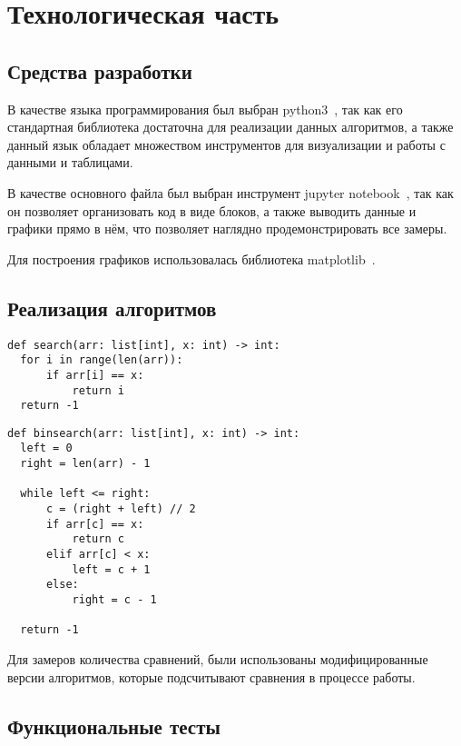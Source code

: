 \chapter{Технологическая часть}
\section{Средства разработки}

В качестве языка программирования был выбран python3~\cite{python3}, так как его стандартная библиотека достаточна для реализации данных алгоритмов, а также данный язык обладает множеством инструментов для визуализации и работы с данными и таблицами.

В качестве основного файла был выбран инструмент jupyter notebook~\cite{python3-jupyter}, так как он позволяет организовать код в виде блоков, а также выводить данные и графики прямо в нём, что позволяет наглядно продемонстрировать все замеры.

Для построения графиков использовалась библиотека matplotlib~\cite{python3-matplotlib}.

\section{Реализация алгоритмов}

\begin{lstlisting}[label=simple-search,caption={Простой алгоритм поиска элемента в массиве}]
def search(arr: list[int], x: int) -> int:
  for i in range(len(arr)):
      if arr[i] == x:
          return i
  return -1
\end{lstlisting}

\begin{lstlisting}[label=bin-search,caption={Бинарный алгоритм поиска элемента в массиве}]
def binsearch(arr: list[int], x: int) -> int:
  left = 0
  right = len(arr) - 1

  while left <= right:
      c = (right + left) // 2
      if arr[c] == x:
          return c
      elif arr[c] < x:
          left = c + 1
      else:
          right = c - 1

  return -1
\end{lstlisting}

Для замеров количества сравнений, были использованы модифицированные версии алгоритмов, которые подсчитывают сравнения в процессе работы.

\section{Функциональные тесты}

